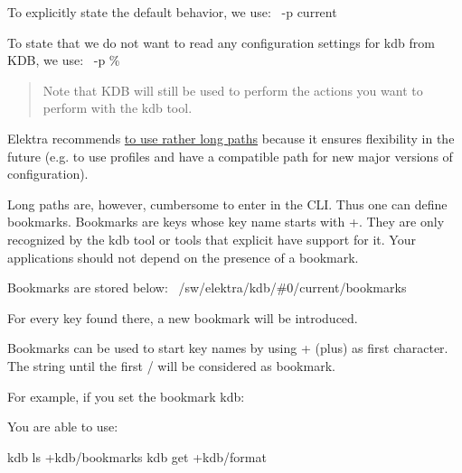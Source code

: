 To explicitly state the default behavior, we use\+:~\newline
 {\ttfamily -\/p current}

To state that we do not want to read any configuration settings for {\ttfamily kdb} from K\+DB, we use\+:~\newline
 {\ttfamily -\/p \%}

\begin{quote}
Note that K\+DB will still be used to perform the actions you want to perform with the {\ttfamily kdb} tool. \end{quote}


Elektra recommends \hyperlink{doc_tutorials_application-integration_md}{to use rather long paths} because it ensures flexibility in the future (e.\+g. to use profiles and have a compatible path for new major versions of configuration).

Long paths are, however, cumbersome to enter in the C\+LI. Thus one can define bookmarks. Bookmarks are keys whose key name starts with {\ttfamily +}. They are only recognized by the {\ttfamily kdb} tool or tools that explicit have support for it. Your applications should not depend on the presence of a bookmark.

Bookmarks are stored below\+:~\newline
 {\ttfamily /sw/elektra/kdb/\#0/current/bookmarks}

For every key found there, a new bookmark will be introduced.

Bookmarks can be used to start key names by using {\ttfamily +} (plus) as first character. The string until the first {\ttfamily /} will be considered as bookmark.

For example, if you set the bookmark kdb\+:




You are able to use\+:


\begin{DoxyCode}
kdb ls +kdb/bookmarks
kdb get +kdb/format
\end{DoxyCode}



